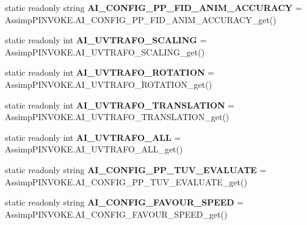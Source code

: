 \begin{DoxyCompactItemize}
\item 
\hypertarget{class_assimp_ab6858a3480d51b17c74c2b0d3373a0a0}{static readonly string {\bfseries A\+I\+\_\+\+C\+O\+N\+F\+I\+G\+\_\+\+P\+P\+\_\+\+F\+I\+D\+\_\+\+A\+N\+I\+M\+\_\+\+A\+C\+C\+U\+R\+A\+C\+Y} = Assimp\+P\+I\+N\+V\+O\+K\+E.\+A\+I\+\_\+\+C\+O\+N\+F\+I\+G\+\_\+\+P\+P\+\_\+\+F\+I\+D\+\_\+\+A\+N\+I\+M\+\_\+\+A\+C\+C\+U\+R\+A\+C\+Y\+\_\+get()}\label{class_assimp_ab6858a3480d51b17c74c2b0d3373a0a0}

\item 
\hypertarget{class_assimp_acfda6a42db4f5fa3abb742ae26a58f00}{static readonly int {\bfseries A\+I\+\_\+\+U\+V\+T\+R\+A\+F\+O\+\_\+\+S\+C\+A\+L\+I\+N\+G} = Assimp\+P\+I\+N\+V\+O\+K\+E.\+A\+I\+\_\+\+U\+V\+T\+R\+A\+F\+O\+\_\+\+S\+C\+A\+L\+I\+N\+G\+\_\+get()}\label{class_assimp_acfda6a42db4f5fa3abb742ae26a58f00}

\item 
\hypertarget{class_assimp_a04b25422605f1793fe835db15d26caee}{static readonly int {\bfseries A\+I\+\_\+\+U\+V\+T\+R\+A\+F\+O\+\_\+\+R\+O\+T\+A\+T\+I\+O\+N} = Assimp\+P\+I\+N\+V\+O\+K\+E.\+A\+I\+\_\+\+U\+V\+T\+R\+A\+F\+O\+\_\+\+R\+O\+T\+A\+T\+I\+O\+N\+\_\+get()}\label{class_assimp_a04b25422605f1793fe835db15d26caee}

\item 
\hypertarget{class_assimp_a21903db725bbd5ea78db79a373a2a6a5}{static readonly int {\bfseries A\+I\+\_\+\+U\+V\+T\+R\+A\+F\+O\+\_\+\+T\+R\+A\+N\+S\+L\+A\+T\+I\+O\+N} = Assimp\+P\+I\+N\+V\+O\+K\+E.\+A\+I\+\_\+\+U\+V\+T\+R\+A\+F\+O\+\_\+\+T\+R\+A\+N\+S\+L\+A\+T\+I\+O\+N\+\_\+get()}\label{class_assimp_a21903db725bbd5ea78db79a373a2a6a5}

\item 
\hypertarget{class_assimp_a2182aad27af335886e30a50e39e76c8c}{static readonly int {\bfseries A\+I\+\_\+\+U\+V\+T\+R\+A\+F\+O\+\_\+\+A\+L\+L} = Assimp\+P\+I\+N\+V\+O\+K\+E.\+A\+I\+\_\+\+U\+V\+T\+R\+A\+F\+O\+\_\+\+A\+L\+L\+\_\+get()}\label{class_assimp_a2182aad27af335886e30a50e39e76c8c}

\item 
\hypertarget{class_assimp_a0debc7e3f5e2e356633b0a2baf983fd8}{static readonly string {\bfseries A\+I\+\_\+\+C\+O\+N\+F\+I\+G\+\_\+\+P\+P\+\_\+\+T\+U\+V\+\_\+\+E\+V\+A\+L\+U\+A\+T\+E} = Assimp\+P\+I\+N\+V\+O\+K\+E.\+A\+I\+\_\+\+C\+O\+N\+F\+I\+G\+\_\+\+P\+P\+\_\+\+T\+U\+V\+\_\+\+E\+V\+A\+L\+U\+A\+T\+E\+\_\+get()}\label{class_assimp_a0debc7e3f5e2e356633b0a2baf983fd8}

\item 
\hypertarget{class_assimp_a1e6a77b0eee26bd9236f0bc87e37a767}{static readonly string {\bfseries A\+I\+\_\+\+C\+O\+N\+F\+I\+G\+\_\+\+F\+A\+V\+O\+U\+R\+\_\+\+S\+P\+E\+E\+D} = Assimp\+P\+I\+N\+V\+O\+K\+E.\+A\+I\+\_\+\+C\+O\+N\+F\+I\+G\+\_\+\+F\+A\+V\+O\+U\+R\+\_\+\+S\+P\+E\+E\+D\+\_\+get()}\label{class_assimp_a1e6a77b0eee26bd9236f0bc87e37a767}


\end{DoxyCompactItemize}
